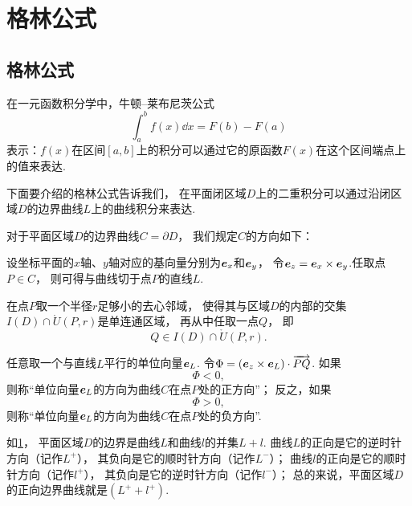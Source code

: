 \section{格林公式}
\subsection{格林公式}
在一元函数积分学中，牛顿--莱布尼茨公式\[
	\int_a^b f(x) \dd{x} = F(b) - F(a)
\]表示：\(f(x)\)在区间\([a,b]\)上的积分可以通过它的原函数\(F(x)\)在这个区间端点上的值来表达.

下面要介绍的格林公式告诉我们，
在平面闭区域\(D\)上的二重积分可以通过沿闭区域\(D\)的边界曲线\(L\)上的曲线积分来表达.

\begin{definition}\label{definition:线积分与面积分.平面闭区域的边界曲线的取向}
对于平面区域\(D\)的边界曲线\(C = \partial D\)，
我们规定\(C\)的方向如下：

设坐标平面的\(x\)轴、\(y\)轴对应的基向量分别为\(\boldsymbol{e}_x\)和\(\boldsymbol{e}_y\)，
令\(\boldsymbol{e}_z = \boldsymbol{e}_x \times \boldsymbol{e}_y\).任取点\(P \in C\)，
则可得与曲线切于点\(P\)的直线\(L\).

在点\(P\)取一个半径\(r\)足够小的去心邻域，
使得其与区域\(D\)的内部的交集\(I(D) \cap \mathring{U}(P,r)\)是单连通区域，
再从中任取一点\(Q\)，
即\[
	Q \in I(D) \cap \mathring{U}(P,r).
\]

任意取一个与直线\(L\)平行的单位向量\(\boldsymbol{e}_L\).
令\(\Phi = (\boldsymbol{e}_z \times \boldsymbol{e}_L) \cdot \overrightarrow{PQ}\).
如果\[
\Phi < 0,
\]
则称“单位向量\(\boldsymbol{e}_L\)的方向为曲线\(C\)在点\(P\)处的正方向”；
反之，如果\[
	\Phi > 0,
\]
则称“单位向量\(\boldsymbol{e}_L\)的方向为曲线\(C\)在点\(P\)处的负方向”.
\end{definition}
如\cref{figure:线积分与面积分.平面区域的边界曲线与其取向}，
平面区域\(D\)的边界是曲线\(L\)和曲线\(l\)的并集\(L+l\).
曲线\(L\)的正向是它的逆时针方向（记作\(L^+\)），
其负向是它的顺时针方向（记作\(L^-\)）；
曲线\(l\)的正向是它的顺时针方向（记作\(l^+\)），
其负向是它的逆时针方向（记作\(l^-\)）；
总的来说，平面区域\(D\)的正向边界曲线就是\((L^+ + l^+)\).

\begin{figure}[htb]
\centering
{}
\caption{}
\label{figure:线积分与面积分.平面区域的边界曲线与其取向}
\end{figure}

